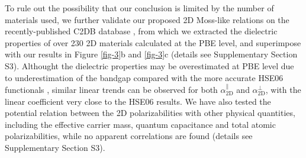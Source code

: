 \documentclass[journal=ancac3,manuscript=article,email=true,hyperref=true,keywords=false]{achemso}
\begin{document}
To rule out the possibility that our conclusion is limited by the
number of materials used, we further validate our proposed 2D
Moss-like relations on the recently-published C2DB database
\cite{Haastrup_2018}, from which we extracted the dielectric
properties of over 230 2D materials calculated at the PBE level, and
superimpose with our results in Figure \ref{fig-3}b and \ref{fig-3}c
(details see Supplementary Section S3). Althought the dielectric
properties may be overestimated at PBE level due to underestimation of
the bandgap compared with the more accurate HSE06 functionals
\cite{Van_Dyck_2017}, similar linear trends can be observed for both
$\alpha^{\parallel}_{\mathrm{2D}}$ and $\alpha_{\mathrm{2D}}^{\perp}$,
with the linear coefficient very close to the HSE06 results. We have
also tested the potential relation between the 2D polarizabilities
with other physical quantities, including the effective carrier mass,
quantum capacitance and total atomic polarizabilities, while no
apparent correlations are found (details see Supplementary Section
S3).
\end{document}
